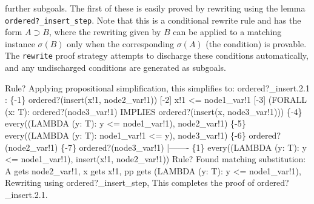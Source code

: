 \documentclass[11pt,twoside]{book}
\begin{document}
further subgoals.  The first of these is easily proved by rewriting
using the lemma \texttt{ordered?\_insert\_step}\@.  Note that this is a
conditional rewrite rule and has the form $A\supset B$, where the
rewriting given by  $B$ can be applied  to a matching instance $\sigma(B)$
only when the 
corresponding $\sigma(A)$ (the condition) is provable.  The \texttt{rewrite} proof strategy attempts to discharge these conditions
automatically, and any undischarged conditions are 
generated as subgoals.
\begin{session*}
Rule? 
Applying propositional simplification,
this simplifies to: 
ordered?_insert.2.1 :  
\{-1\}   ordered?(insert(x!1, node2_var!1))
[-2]   x!1 <= node1_var!1
[-3]   (FORALL (x: T):
         ordered?(node3_var!1) IMPLIES ordered?(insert(x, node3_var!1)))
\{-4\}   every((LAMBDA (y: T): y <= node1_var!1), node2_var!1)
\{-5\}   every((LAMBDA (y: T): node1_var!1 <= y), node3_var!1)
\{-6\}   ordered?(node2_var!1)
\{-7\}   ordered?(node3_var!1)
  |-------
\{1\}   every((LAMBDA (y: T): y <= node1_var!1), insert(x!1, node2_var!1))
Rule? 
Found matching substitution:
A gets node2_var!1,
x gets x!1,
pp gets (LAMBDA (y: T): y <= node1_var!1),
Rewriting using ordered?_insert_step,
This completes the proof of ordered?_insert.2.1.
\end{session*}
\end{document}
